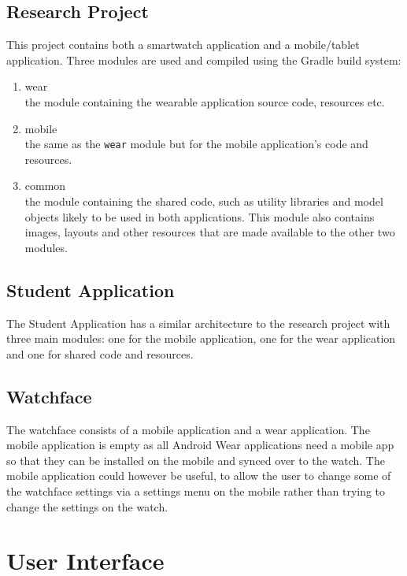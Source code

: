 \subsection{Research Project}
This project contains both a smartwatch application and a mobile/tablet
application. Three modules are used and compiled using the Gradle build system:
\begin{enumerate}
\item wear\\
the module containing the wearable application source code, resources etc.
\item mobile\\
the same as the \texttt{wear} module but for the mobile application's code and
resources.
\item common\\
the module containing the shared code, such as utility libraries and model
objects likely to be used in both applications. This module also contains
images, layouts and other resources that are made available to the other two
modules.
\end{enumerate}

\subsection{Student Application}
The Student Application has a similar architecture to the research project with
three main modules: one for the mobile application, one for the wear application
and one for shared code and resources.

\subsection{Watchface}
The watchface consists of a mobile application and a wear application. The
mobile application is empty as all Android Wear applications need a mobile app
so that they can be installed on the mobile and synced over to the watch.
The mobile application could however be useful, to allow the user to change some
of the watchface settings via a settings menu on the mobile rather than trying
to change the settings on the watch.

\section{User Interface}

